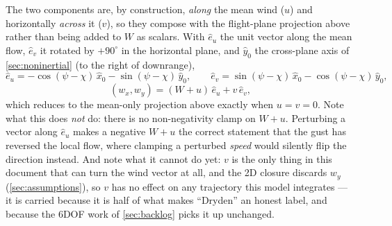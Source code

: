 The two components are, by construction, \emph{along} the mean wind ($u$) and horizontally
\emph{across} it ($v$), so they compose with the flight-plane projection above rather than being
added to $W$ as scalars. With $\hat{e}_u$ the unit vector along the mean flow, $\hat{e}_v$ it
rotated by $+90^\circ$ in the horizontal plane, and $\hat{y}_0$ the cross-plane axis of
\autoref{sec:noninertial} (to the right of downrange),
\begin{equation} \label{eq:dryden_composition}
    \hat{e}_u = -\cos(\psi-\chi)\,\hat{x}_0 - \sin(\psi-\chi)\,\hat{y}_0, \qquad
    \hat{e}_v = \sin(\psi-\chi)\,\hat{x}_0 - \cos(\psi-\chi)\,\hat{y}_0,
\end{equation}
\begin{equation} \label{eq:dryden_wind}
    (w_x,w_y) = (W+u)\,\hat{e}_u + v\,\hat{e}_v,
\end{equation}
which reduces to the mean-only projection above exactly when $u=v=0$. Note what this does
\emph{not} do: there is no non-negativity clamp on $W+u$. Perturbing a vector along $\hat{e}_u$
makes a negative $W+u$ the correct statement that the gust has reversed the local flow, where
clamping a perturbed \emph{speed} would silently flip the direction instead. And note what it
cannot do yet: $v$ is the only thing in this document that can turn the wind vector at all, and
the 2D closure discards $w_y$ (\autoref{sec:assumptions}), so $v$ has no effect on any trajectory
this model integrates --- it is carried because it is half of what makes ``Dryden'' an honest
label, and because the 6DOF work of \autoref{sec:backlog} picks it up unchanged.

